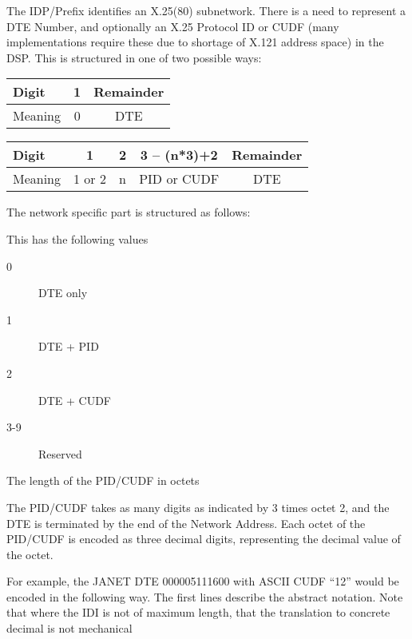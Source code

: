 The IDP/Prefix identifies an X.25(80) subnetwork.
There is a need to represent a DTE Number, and optionally an X.25
Protocol ID or CUDF (many implementations require these due 
to shortage of X.121 address space) in the DSP.
This is structured in one of two possible ways:

\begin {center}
\begin {tabular}{|l||c|c|}
\hline
Digit   & 1 & Remainder \\
\hline 
Meaning  & 0 & DTE \\
\hline
\end {tabular}
\end {center}


\begin {center}
\begin {tabular}{|l||c|c|c|c|}
\hline
Digit   & 1  & 2 & 3 -- (n*3)+2 & Remainder \\
\hline
Meaning   & 1 or 2 & n  &  PID or CUDF & DTE \\
\hline
\end {tabular}
\end {center}

The network specific part is structured as follows:

\begin {description}
\item [1]  This has the following values
\begin {description}
\item [0] DTE only
\item [1] DTE + PID 
\item [2] DTE + CUDF 
\item [3-9] Reserved
\end {description}

\item[2]

The length of the PID/CUDF in octets

\item [Remainder] The PID/CUDF takes as many digits as indicated by
3 times octet 2, and the DTE is terminated by the end of the Network Address.
Each octet of the PID/CUDF is encoded as three decimal digits, representing
the decimal value of the octet.

\item 
\end {description}

For example, the JANET DTE 000005111600 with ASCII CUDF ``12'' would be
encoded in the following way.  The first lines describe the abstract
notation.  Note that where the IDI is not of maximum length, that the
translation to concrete decimal is not mechanical

